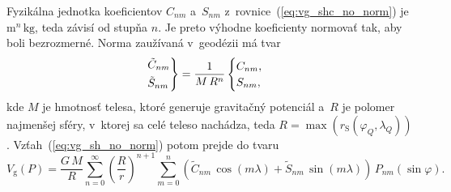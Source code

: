 \documentclass[a4paper, 12pt]{book}
\newcommand{\gidx}{\mathrm g}
\begin{document}
Fyzikálna jednotka koeficientov $C_{nm}$ a~$S_{nm}$ 
z~rovnice~(\ref{eq:vg_shc_no_norm}) je $\mathrm{m}^n \, \mathrm{kg}$, teda 
závisí od stupňa $n$.  Je preto výhodne koeficienty normovať tak, aby boli 
bezrozmerné.  Norma zaužívaná v~geodézii má tvar
%
\begin{equation}
\begin{rcases}
\tilde{C}_{nm}\\
\tilde{S}_{nm}
\end{rcases}
= \frac{1}{M \, R^n}
\begin{cases}
C_{nm}{,}\\
S_{nm}{,}
\end{cases}
\end{equation}
%
kde $M$ je hmotnosť telesa, ktoré generuje gravitačný potenciál a~$R$ je 
polomer najmenšej sféry, v~ktorej sa celé teleso nachádza, teda $R 
= \max(r_\mathrm{S}(\varphi_Q, \lambda_Q))$.  Vzťah~(\ref{eq:vg_sh_no_norm}) 
potom prejde do tvaru
%
\begin{equation}
\label{eq:vg_sh_1st_norm}
V_\gidx(P) = \frac{G \, M}{R} \sum_{n = 0}^\infty \left( \frac{R}{r} \right)^{n 
+ 1} \sum_{m = 0}^{n} \left( \tilde{C}_{nm} \, \cos(m\lambda) + \tilde{S}_{nm} 
\, \sin(m\lambda)\right) \, P_{nm}(\sin\varphi){.}
\end{equation}
\end{document}
